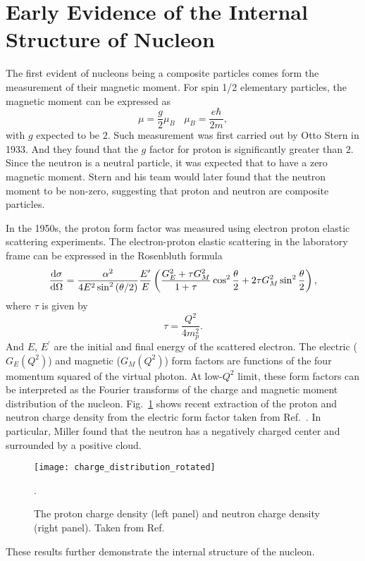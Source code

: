 \section {Early Evidence of the Internal Structure of Nucleon}
The first evident of nucleons being a composite particles comes form the 
measurement of their magnetic moment. For spin 1/2 elementary particles, the 
magnetic moment can be expressed as 
\begin{equation}
\mu = \frac{g}{2}\mu_B ~~~~ \mu_B = \frac{e\hbar}{2m},
\end{equation}
with $g$ expected to be $2$. Such measurement was first carried out by Otto 
Stern in 1933. And they found that the $g$ factor for proton is significantly 
greater than $2$. Since the neutron is a neutral particle, it was expected that
to have a zero magnetic moment. Stern and his team would later found that the 
neutron moment to be non-zero, suggesting that proton and neutron are composite
particles.

In the 1950s, the proton form factor was measured using electron proton elastic
scattering experiments\cite{hofstadter1956}. The electron-proton elastic 
scattering in the laboratory frame can be expressed in the Rosenbluth formula
\begin{equation}
\dv{\sigma}{\Omega} = \frac{\alpha^2}{4E^2 \sin^2\left(\theta/2\right)} 
	\frac{E^\prime}{E} \left( \frac{G_E^2+\tau G_M^2}{1+\tau} \cos^2 
	\frac{\theta}{2} + 2\tau G_M^2 \sin^2 \frac{\theta}{2}\right)
	\label{eq:ep_cs},
\end{equation}
where $\tau$ is given by
\begin{equation}
\tau = \frac{Q^2}{4m_p^2}.
\end{equation}
And $E$, $E^\prime$ are the initial and final energy of the scattered electron.
The electric ($G_E\left(Q^2\right)$) and magnetic ($G_M\left(Q^2\right)$) form
factors are functions of the four momentum squared of the virtual photon. At 
low-$Q^2$ limit, these form factors can be interpreted as the Fourier transforms
of the charge and magnetic moment distribution of the nucleon. Fig.\ \ref{fig:charge}
shows recent extraction of the proton and neutron charge density from the electric
form factor taken from Ref.\ \cite{miller2007}. In particular, Miller found that
the neutron has a negatively charged center and surrounded by a positive cloud. 
\begin{figure}[htbp!]
    \centering
    \texttt{[image: charge\_distribution\_rotated]}
    \caption{The proton charge density (left panel) and neutron charge density
	(right panel). Taken from Ref.\ \cite{miller2007}}.
    \label{fig:charge}
\end{figure}
These results further demonstrate the internal structure of the nucleon.

